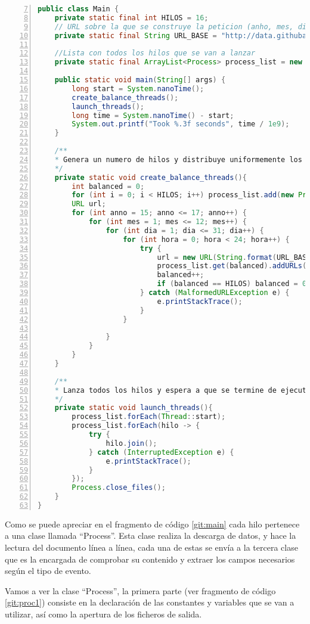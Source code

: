 \clearpage
\begin{lstlisting}[label=git:main,language=java,frame=single,caption=Clase \textit{Main} de la aplicación de aprovisionamiento de datos de GitHub., firstnumber=7,numbers=left]
public class Main {
	private static final int HILOS = 16;
	// URL sobre la que se construye la peticion (anho, mes, dia y hora)
	private static final String URL_BASE = "http://data.githubarchive.org/20%d-%02d-%02d-%02d.json.gz";
	
	//Lista con todos los hilos que se van a lanzar
	private static final ArrayList<Process> process_list = new ArrayList<>();
	
	public static void main(String[] args) {
		long start = System.nanoTime();
		create_balance_threads();
		launch_threads();
		long time = System.nanoTime() - start;
		System.out.printf("Took %.3f seconds", time / 1e9);
	}
	
	/**
	* Genera un numero de hilos y distribuye uniformemente los ficheros que se descargaran
	*/
	private static void create_balance_threads(){
		int balanced = 0;
		for (int i = 0; i < HILOS; i++) process_list.add(new Process());
		URL url;
		for (int anno = 15; anno <= 17; anno++) {
			for (int mes = 1; mes <= 12; mes++) {
				for (int dia = 1; dia <= 31; dia++) {
					for (int hora = 0; hora < 24; hora++) {
						try {
							url = new URL(String.format(URL_BASE, anno, mes, dia, hora));
							process_list.get(balanced).addURLs(url);
							balanced++;
							if (balanced == HILOS) balanced = 0;
						} catch (MalformedURLException e) {
							e.printStackTrace();
						}
					}

				}
			}	
		}
	}
	
	/**
	* Lanza todos los hilos y espera a que se termine de ejecutar
	*/
	private static void launch_threads(){
		process_list.forEach(Thread::start);
		process_list.forEach(hilo -> {
			try {
				hilo.join();
			} catch (InterruptedException e) {
				e.printStackTrace();
			}
		});
		Process.close_files();
	}
}
\end{lstlisting}

Como se puede apreciar en el fragmento de código \ref{git:main} cada hilo pertenece a una clase llamada ``Process''. Esta clase realiza la descarga de datos, y hace la lectura del documento línea a línea, cada una de estas se envía a la tercera clase que es la encargada de comprobar su contenido y extraer los campos necesarios según el tipo de evento.

Vamos a ver la clase ``Process'', la primera parte (ver fragmento de código \ref{git:proc1}) consiste en la declaración de las constantes y variables que se van a utilizar, así como la apertura de los ficheros de salida.


